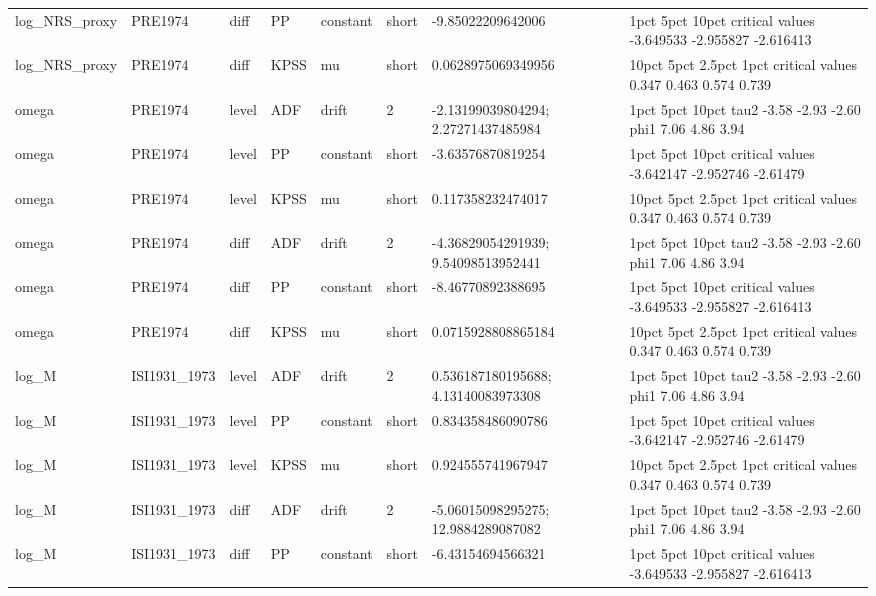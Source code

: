 \begin{tabular}{llllllll}
log\_NRS\_proxy & PRE1974 & diff & PP & constant & short & -9.85022209642006 &                      1pct      5pct     10pct critical values -3.649533 -2.955827 -2.616413 \\
log\_NRS\_proxy & PRE1974 & diff & KPSS & mu & short & 0.0628975069349956 &                 10pct  5pct 2.5pct  1pct critical values 0.347 0.463  0.574 0.739 \\
omega & PRE1974 & level & ADF & drift & 2 & -2.13199039804294; 2.27271437485984 &       1pct  5pct 10pct tau2 -3.58 -2.93 -2.60 phi1  7.06  4.86  3.94 \\
omega & PRE1974 & level & PP & constant & short & -3.63576870819254 &                      1pct      5pct    10pct critical values -3.642147 -2.952746 -2.61479 \\
omega & PRE1974 & level & KPSS & mu & short & 0.117358232474017 &                 10pct  5pct 2.5pct  1pct critical values 0.347 0.463  0.574 0.739 \\
omega & PRE1974 & diff & ADF & drift & 2 & -4.36829054291939; 9.54098513952441 &       1pct  5pct 10pct tau2 -3.58 -2.93 -2.60 phi1  7.06  4.86  3.94 \\
omega & PRE1974 & diff & PP & constant & short & -8.46770892388695 &                      1pct      5pct     10pct critical values -3.649533 -2.955827 -2.616413 \\
omega & PRE1974 & diff & KPSS & mu & short & 0.0715928808865184 &                 10pct  5pct 2.5pct  1pct critical values 0.347 0.463  0.574 0.739 \\
log\_M & ISI1931\_1973 & level & ADF & drift & 2 & 0.536187180195688; 4.13140083973308 &       1pct  5pct 10pct tau2 -3.58 -2.93 -2.60 phi1  7.06  4.86  3.94 \\
log\_M & ISI1931\_1973 & level & PP & constant & short & 0.834358486090786 &                      1pct      5pct    10pct critical values -3.642147 -2.952746 -2.61479 \\
log\_M & ISI1931\_1973 & level & KPSS & mu & short & 0.924555741967947 &                 10pct  5pct 2.5pct  1pct critical values 0.347 0.463  0.574 0.739 \\
log\_M & ISI1931\_1973 & diff & ADF & drift & 2 & -5.06015098295275; 12.9884289087082 &       1pct  5pct 10pct tau2 -3.58 -2.93 -2.60 phi1  7.06  4.86  3.94 \\
log\_M & ISI1931\_1973 & diff & PP & constant & short & -6.43154694566321 &                      1pct      5pct     10pct critical values -3.649533 -2.955827 -2.616413 \\

\end{tabular}
